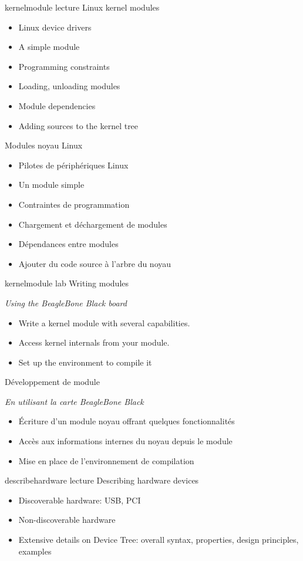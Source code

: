 {kernelmodule}
{lecture}
{Linux kernel modules}
{
  \begin{itemize}
  \item Linux device drivers
  \item A simple module
  \item Programming constraints
  \item Loading, unloading modules
  \item Module dependencies
  \item Adding sources to the kernel tree
  \end{itemize}
}
{Modules noyau Linux}
{
  \begin{itemize}
  \item Pilotes de périphériques Linux
  \item Un module simple
  \item Contraintes de programmation
  \item Chargement et déchargement de modules
  \item Dépendances entre modules
  \item Ajouter du code source à l'arbre du noyau
  \end{itemize}
}
{kernelmodule}
{lab}
{Writing modules}
{
  {\em Using the BeagleBone Black board}
  \begin{itemize}
  \item Write a kernel module with several capabilities.
  \item Access kernel internals from your module.
  \item Set up the environment to compile it
  \end{itemize}
}
{Développement de module}
{
  {\em En utilisant la carte BeagleBone Black}
  \begin{itemize}
  \item Écriture d'un module noyau offrant quelques fonctionnalités
  \item Accès aux informations internes du noyau depuis le module
  \item Mise en place de l'environnement de compilation
  \end{itemize}
}
{describehardware}
{lecture}
{Describing hardware devices}
{
  \begin{itemize}
  \item Discoverable hardware: USB, PCI
  \item Non-discoverable hardware
  \item Extensive details on Device Tree: overall syntax, properties,
    design principles, examples
  \end{itemize}
}
